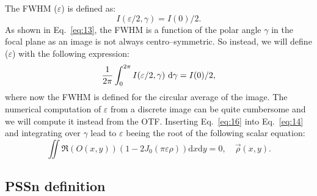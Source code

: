 \documentclass{gmto}
\begin{document}
\def\psf{\mathrm{psf}}
\def\otf{\mathrm{otf}}
The FWHM ($\varepsilon$) is defined as:
\begin{equation}
  \label{eq:13}
  I(\varepsilon/2,\gamma) =  I(0)/2.
\end{equation}
As shown in Eq.~\eqref{eq:13}, the FWHM is a function of the polar angle $\gamma$
in the focal plane as an image is not always centro--symmetric.
So instead, we will define ($\varepsilon$) with the following expression:
\begin{equation}
  \label{eq:14}
  {1\over 2\pi}\int_0^{2\pi}I(\varepsilon/2,\gamma)\ \mathrm{d}\gamma =  I(0)/2,  
\end{equation}
where now the FWHM is defined for the circular average of the image.
The numerical computation of $\varepsilon$ from a discrete image can be quite
cumbersome and we will compute it instead from the OTF.
Inserting Eq.~\eqref{eq:16} into Eq.~\eqref{eq:14} and integrating over $\gamma$
lead to $\varepsilon$ beeing the root of the following scalar equation:
\begin{equation}
  \label{eq:15}
  \iint \Re\left(O(x,y)\right) \left(1 - 2J_0(\pi\varepsilon\rho)\right)\mathrm{d}x\mathrm{d}y = 0, \quad\vec\rho(x,y).
\end{equation}


\subsection{PSSn definition}
\label{sec:pssn-def}
\end{document}
